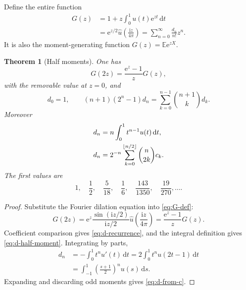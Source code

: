 \documentclass[11pt]{article}
\newtheorem{theorem}{Theorem}[section]
\theoremstyle{definition}
\theoremstyle{remark}
\newcommand{\E}{\mathbb E}\newcommand{\Prob}{\mathbb P}
\newcommand{\dd}{\,\mathrm d}\newcommand{\e}{\mathrm e}\newcommand{\ii}{\mathrm i}
\begin{document}
Define the entire function
\begin{equation}\label{eq:G-def}
 \begin{aligned}
 G(z)&=1+z\int_0^1u(t)\e^{zt}\dd t\\
 &=\e^{z/2}\widehat u\!\left(\frac{\ii z}{4\pi}\right)
 =\sum_{n=0}^{\infty}\frac{d_n}{n!}z^n.
 \end{aligned}
\end{equation}
It is also the moment-generating function $G(z)=\E\e^{zX}$.

\begin{theorem}[Half moments]\label{thm:d-recurrence}
One has
\begin{equation}\label{eq:G-functional}
 G(2z)=\frac{\e^z-1}{z}G(z),
\end{equation}
with the removable value at $z=0$, and
\begin{equation}\label{eq:d-recurrence}
 d_0=1,
 \qquad
 (n+1)(2^n-1)d_n
 =\sum_{k=0}^{n-1}\binom{n+1}{k}d_k.
\end{equation}
Moreover
\begin{align}
 d_n&=n\int_0^1t^{n-1}u(t)\dd t,\label{eq:d-half-moment}\\
 d_n&=2^{-n}\sum_{k=0}^{\floor{n/2}}\binom n{2k}c_k.\label{eq:d-from-c}
\end{align}
The first values are
\[
 1,\quad\frac12,\quad\frac5{18},\quad\frac16,
 \quad\frac{143}{1350},\quad\frac{19}{270},\ldots.
\]
\end{theorem}
\begin{proof}
Substitute the Fourier dilation equation into \eqref{eq:G-def}:
\[
 G(2z)=\e^z\frac{\sin(\ii z/2)}{\ii z/2}
 \widehat u\!\left(\frac{\ii z}{4\pi}\right)
 =\frac{\e^z-1}{z}G(z).
\]
Coefficient comparison gives \eqref{eq:d-recurrence}, and the integral definition gives \eqref{eq:d-half-moment}.  Integrating by parts,
\begin{align*}
 d_n&=-\int_0^1t^nu'(t)\dd t
 =2\int_0^1t^nu(2t-1)\dd t\\
 &=\int_{-1}^{1}\left(\frac{s+1}{2}\right)^nu(s)\dd s.
\end{align*}
Expanding and discarding odd moments gives \eqref{eq:d-from-c}.
\end{proof}
\end{document}
